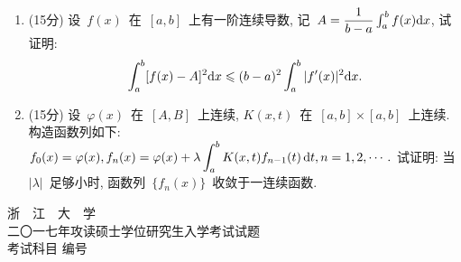 \documentclass[UTF8,a4paper,11pt]{article}
\begin{document}
\begin{enumerate}
	      \vspace{2em}
	\item (15分) 设~$f(x)$~在~$[a,b]$~上有一阶连续导数, 记~$A=\dfrac{1}{b-a}\int_a^b f(x)\mathrm{d}x$, 试证明:
	      \[\int_a^b[f(x)-A]^2\ud{x}\leqslant(b-a)^2\int_a^b|f\rq{}(x)|^2\ud{x}.\]
	      \vspace{2em}
	\item (15分) 设~$\varphi(x)$~在~$[A,B]$~上连续, $K(x,t)$~在~$[a,b]\times[a,b]$~上连续. 构造函数列如下: $f_0(x)=\varphi(x), f_n(x)=\varphi(x)+\displaystyle\lambda\int_a^b K(x,t)f_{n-1}(t)\,\mathrm{d}t, n=1,2,\cdots.$ 试证明: 当~$|\lambda|$~足够小时, 函数列~$\{f_n(x)\}$~收敛于一连续函数.
	      \vspace{2em}
\end{enumerate}

\newpage
\setcounter{page}{1}

\begin{center}
	{\Huge 浙~~江~~大~~学}\\
	\setlength{\parskip}{5pt}
	{\Large 二〇一七年攻读硕士学位研究生入学考试试题}\\
	\setlength{\parskip}{10 pt}
	{\Large 考试科目\underline{} 编号\underline{}}
\end{center}
\end{document}
